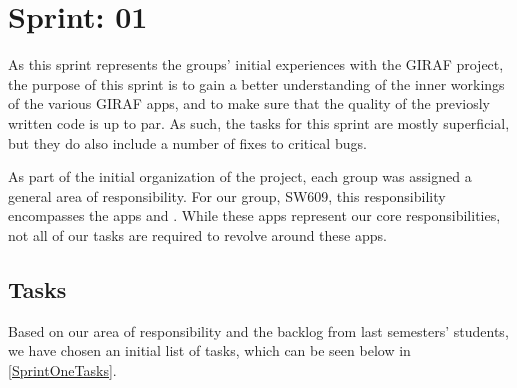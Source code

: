\chapter{Sprint: 01}
As this sprint represents the groups' initial experiences with the GIRAF
project, the purpose of this sprint is to gain a better understanding of
the inner workings of the various GIRAF apps, and to make sure that the quality
of the previosly written code is up to par. As such, the tasks for this sprint
are mostly superficial, but they do also include a number of fixes to critical
bugs.\nl

As part of the initial organization of the project, each group was assigned a
general area of responsibility. For our group, SW609, this responsibility
encompasses the apps  and . While
these apps represent our core responsibilities, not all of our tasks are
required to revolve around these apps.

\section{Tasks}
Based on our area of responsibility and the backlog from last semesters'
students, we have chosen an initial list of tasks, which can be seen below in
\autoref{SprintOneTasks}. 

